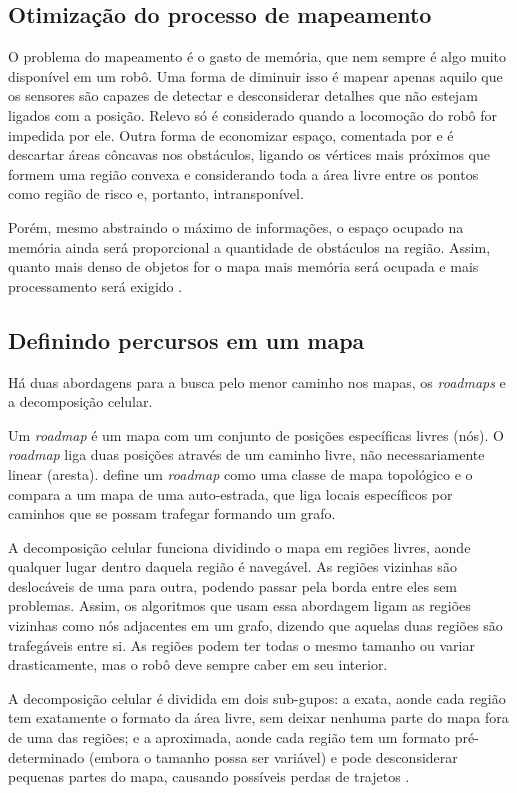 \subsection{Otimização do processo de mapeamento}

O problema do mapeamento é o gasto de memória, que nem sempre é algo muito disponível em um robô. Uma forma de diminuir isso é mapear apenas aquilo que os sensores são capazes de detectar e desconsiderar detalhes que não estejam ligados com a posição. Relevo só é considerado quando a locomoção do robô for impedida por ele. Outra forma de economizar espaço, comentada por \cite{Siegwart2004} e \cite{Guzman2008} é descartar áreas côncavas nos obstáculos, ligando os vértices mais próximos que formem uma região convexa e considerando toda a área livre entre os pontos como região de risco e, portanto, intransponível.

Porém, mesmo abstraindo o máximo de informações, o espaço ocupado na memória ainda será proporcional a quantidade de obstáculos na região. Assim, quanto mais denso de objetos for o mapa mais memória será ocupada e mais processamento será exigido \cite{Siegwart2004}.

\subsection{Definindo percursos em um mapa}

Há duas abordagens para a busca pelo menor caminho nos mapas, os \textit{roadmaps} e a decomposição celular.

Um \textit{roadmap} é um mapa com um conjunto de posições específicas livres (nós). O \textit{roadmap} liga duas posições através de um caminho livre, não necessariamente linear (aresta). \cite{Choset2005} define um \textit{roadmap} como uma classe de mapa topológico e o compara a um mapa de uma auto-estrada, que liga locais específicos por caminhos que se possam trafegar formando um grafo.

A decomposição celular funciona dividindo o mapa em regiões livres, aonde qualquer lugar dentro daquela região é navegável. As regiões vizinhas são deslocáveis de uma para outra, podendo passar pela borda entre eles sem problemas. Assim, os algoritmos que usam essa abordagem ligam as regiões vizinhas como nós adjacentes em um grafo, dizendo que aquelas duas regiões são trafegáveis entre si. As regiões podem ter todas o mesmo tamanho ou variar drasticamente, mas o robô deve sempre caber em seu interior.

A decomposição celular é dividida em dois sub-gupos: a exata, aonde cada região tem exatamente o formato da área livre, sem deixar nenhuma parte do mapa fora de uma das regiões; e a aproximada, aonde cada região tem um formato pré-determinado (embora o tamanho possa ser variável) e pode desconsiderar pequenas partes do mapa, causando possíveis perdas de trajetos \cite{Souza2008}.


